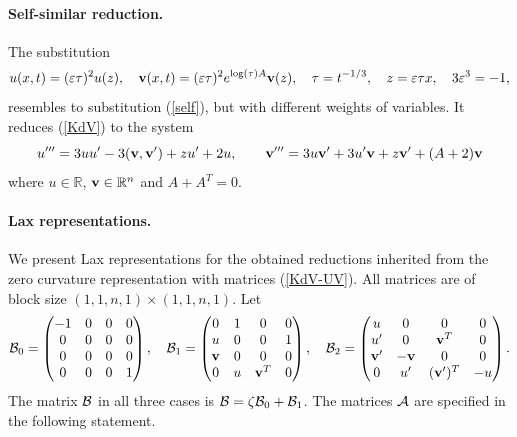 \documentclass[11pt]{article}
\theoremstyle{plain}
\theoremstyle{definition}
\begin{document}
\paragraph{Self-similar reduction.} The substitution
\[
 u(x,t)= (\varepsilon\tau)^2u(z),\quad 
 {\bf v}(x,t)= (\varepsilon\tau)^2e^{\log(\tau)A}{\bf v}(z),\quad 
 \tau=t^{-1/3},\quad z=\varepsilon\tau x,\quad 3\varepsilon^3=-1,
\]
resembles to substitution (\ref{self}), but with different weights of variables. It reduces (\ref{KdV}) to the system
\begin{equation}\label{KdV-self}
 u'''=3uu'-3({\bf v},{\bf v}')+zu'+2u,\qquad 
 {\bf v}'''=3u{\bf v}'+3u'{\bf v}+z{\bf v}'+(A+2){\bf v}
\end{equation}
where $u\in{\mathbb R}$, ${\bf v}\in{\mathbb R}^n$ and $A+A^T=0$.

\paragraph{Lax representations.} We present Lax representations for the obtained reductions inherited from the zero curvature representation with matrices (\ref{KdV-UV}). All matrices are of block size $(1,1,n,1)\times (1,1,n,1)$. Let
\[
 {\cal B}_0=\begin{pmatrix}
  -1 & 0 & 0 & 0\\   
   0 & 0 & 0 & 0\\ 
   0 & 0 & 0 & 0\\   
   0 & 0 & 0 & 1 
 \end{pmatrix},\quad
 {\cal B}_1=\begin{pmatrix}
  0 & 1 & 0 & 0\\   
  u & 0 & 0 & 1\\ 
  {\bf v} & 0 & 0 & 0\\   
  0 & u & {\bf v}^T & 0 
 \end{pmatrix},\quad
 {\cal B}_2=
 \begin{pmatrix}
 u & 0 & 0 & 0\\   
 u' & 0 & {\bf v}^T & 0\\ 
 {\bf v}' & -{\bf v} & 0 & 0\\   
 0 & u' & ({\bf v}')^T & -u 
 \end{pmatrix}. 
\]
The matrix ${\cal B}$ in all three cases is ${\cal B}=\zeta{\cal B}_0+{\cal B}_1$. The matrices ${\cal A}$ are specified in the following statement.
\end{document}
